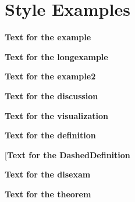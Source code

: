 \section{Style Examples}
\label{sec:styleexamples}
\vspace{10.5cm}

\begin{example}
    \textbf{\large Text for the example}    
\end{example}

\begin{longexample}
    \textbf{\large Text for the longexample}    
\end{longexample}

\begin{example2}
    \vspace{1mm}
    \textbf{\large Text for the example2}
    \tcbline
\end{example2}

\begin{discussion}
    \textbf{\large Text for the discussion}    
\end{discussion}

\begin{visualization}%
    \textbf{\large Text for the visualization}
\end{visualization}

\begin{definition}
    \textbf{\large Text for the definition}
\end{definition}

\begin{DashedDefinition}{}
    [\textbf{\large Text for the DashedDefinition}
\end{DashedDefinition}

\begin{disexam}
    \textbf{\large Text for the disexam}    
\end{disexam}

\begin{theorem}
    \textbf{\large Text for the theorem}
\end{theorem}
    

